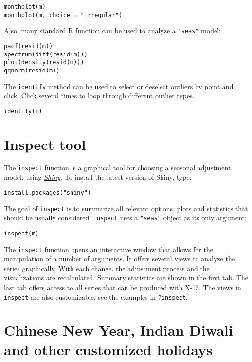 \begin{verbatim}
monthplot(m)
monthplot(m, choice = "irregular")
\end{verbatim}

Also, many standard R function can be used to analyze a \texttt{"seas"}
model:

\begin{verbatim}
pacf(resid(m))
spectrum(diff(resid(m)))
plot(density(resid(m)))
qqnorm(resid(m))
\end{verbatim}

The \texttt{identify} method can be used to select or deselect outliers
by point and click. Click several times to loop through different
outlier types.

\begin{verbatim}
identify(m)
\end{verbatim}

\section{Inspect tool}\label{inspect-tool}

The \texttt{inspect} function is a graphical tool for choosing a
seasonal adjustment model, using
\emph{\href{http://shiny.rstudio.com}{Shiny}}. To install the latest
version of Shiny, type:

\begin{verbatim}
install.packages("shiny")
\end{verbatim}

The goal of \texttt{inspect} is to summarize all relevant options, plots
and statistics that should be usually considered. \texttt{inspect} uses
a \texttt{"seas"} object as its only argument:

\begin{verbatim}
inspect(m)
\end{verbatim}

The \texttt{inspect} function opens an interactive window that allows
for the manipulation of a number of arguments. It offers several views
to analyze the series graphically. With each change, the adjustment
process and the visualizations are recalculated. Summary statistics are
shown in the first tab. The last tab offers access to all series that
can be produced with X-13. The views in \texttt{inspect} are also
customizable, see the examples in \texttt{?inspect}.

\section{Chinese New Year, Indian Diwali and other customized
holidays}\label{chinese-new-year-indian-diwali-and-other-customized-holidays}

